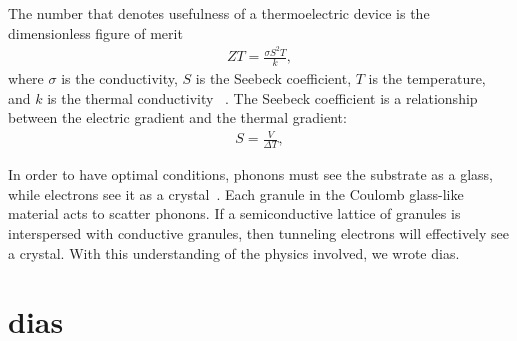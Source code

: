  The number that denotes usefulness of a thermoelectric device is the dimensionless figure of merit
\begin{eqnarray}
ZT = \frac{\sigma S^2 T}{k},
\label{ZT}
\end{eqnarray}
where $\sigma$ is the conductivity, $S$ is the Seebeck coefficient, $T$ is the temperature, and $k$ is the thermal conductivity ~\cite{chen}. The Seebeck coefficient is a relationship between the electric gradient and the thermal gradient:
\begin{eqnarray}
S = \frac{V}{\Delta T},
\label{Seebeck}
\end{eqnarray}

In order to have optimal conditions, phonons must see the substrate as a glass, while electrons see it as a crystal~\cite{Rowe05}. Each granule in the Coulomb glass-like material acts to scatter phonons. If a semiconductive lattice of granules is interspersed with conductive granules, then tunneling electrons will effectively see a crystal. With this understanding of the physics involved, we wrote {\sc dias}.  

\section{{\sc dias}}

